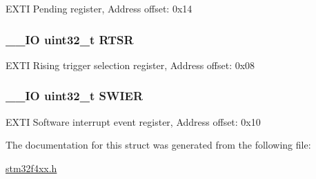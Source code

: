 E\-X\-T\-I Pending register, Address offset\-: 0x14 \hypertarget{struct_e_x_t_i___type_def_a0d952a17455687d6e9053730d028fa1d}{
\subsubsection[{R\-T\-S\-R}]{\setlength{\rightskip}{0pt plus 5cm}\-\_\-\-\_\-\-I\-O uint32\-\_\-t R\-T\-S\-R}}\label{struct_e_x_t_i___type_def_a0d952a17455687d6e9053730d028fa1d}
E\-X\-T\-I Rising trigger selection register, Address offset\-: 0x08 \hypertarget{struct_e_x_t_i___type_def_a9eae93b6cc13d4d25e12f2224e2369c9}{
\subsubsection[{S\-W\-I\-E\-R}]{\setlength{\rightskip}{0pt plus 5cm}\-\_\-\-\_\-\-I\-O uint32\-\_\-t S\-W\-I\-E\-R}}\label{struct_e_x_t_i___type_def_a9eae93b6cc13d4d25e12f2224e2369c9}
E\-X\-T\-I Software interrupt event register, Address offset\-: 0x10 

The documentation for this struct was generated from the following file\-:\begin{DoxyCompactItemize}
\item 
\hyperlink{stm32f4xx_8h}{stm32f4xx.\-h}\end{DoxyCompactItemize}
